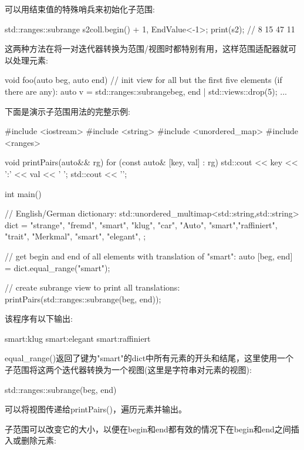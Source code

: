 可以用结束值的特殊哨兵来初始化子范围:

\begin{cpp}
std::ranges::subrange s2{coll.begin() + 1, EndValue<-1>{}};
print(s2); // 8 15 47 11
\end{cpp}

这两种方法在将一对迭代器转换为范围/视图时都特别有用，这样范围适配器就可以处理元素:

\begin{cpp}
void foo(auto beg, auto end)
{
	// init view for all but the first five elements (if there are any):
	auto v = std::ranges::subrange{beg, end} | std::views::drop(5);
	...
}
\end{cpp}

下面是演示子范围用法的完整示例:


\begin{cpp}
#include <iostream>
#include <string>
#include <unordered_map>
#include <ranges>

void printPairs(auto&& rg)
{
	for (const auto& [key, val] : rg) {
		std::cout << key << ':' << val << ' ';
	}
	std::cout << '\n';
}

int main()
{
	// English/German dictionary:
	std::unordered_multimap<std::string,std::string> dict = {
		{"strange", "fremd"},
		{"smart", "klug"},
		{"car", "Auto"},
		{"smart","raffiniert"},
		{"trait", "Merkmal"},
		{"smart", "elegant"},
	};
	
	// get begin and end of all elements with translation of "smart":
	auto [beg, end] = dict.equal_range("smart");
	
	// create subrange view to print all translations:
	printPairs(std::ranges::subrange(beg, end));
}
\end{cpp}

该程序有以下输出:

\begin{shell}
smart:klug smart:elegant smart:raffiniert
\end{shell}

equal\_range()返回了键为"smart"的dict中所有元素的开头和结尾，这里使用一个子范围将这两个迭代器转换为一个视图(这里是字符串对元素的视图):

\begin{cpp}
std::ranges::subrange(beg, end)
\end{cpp}

可以将视图传递给printPairs()，遍历元素并输出。

子范围可以改变它的大小，以便在begin和end都有效的情况下在begin和end之间插入或删除元素:

